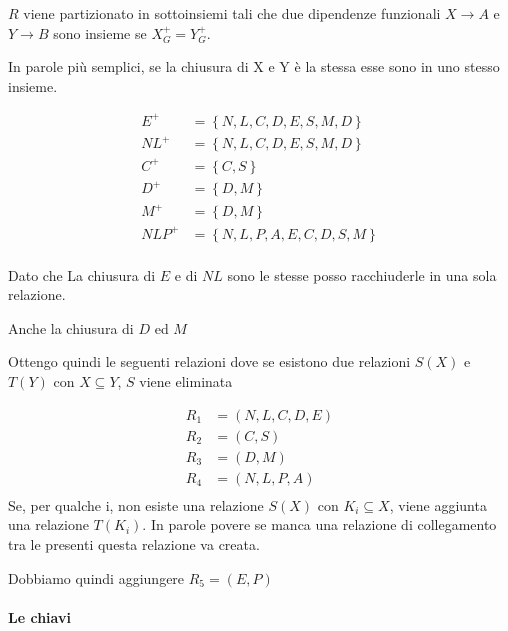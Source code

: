 \begin{exmp}
    $R$ viene partizionato in sottoinsiemi tali che due dipendenze funzionali $X \rightarrow A$ e $Y \rightarrow B$ sono insieme se $X_G^+=Y_G^+$.

    In parole più semplici, se la chiusura di X e Y è la stessa esse sono in uno stesso insieme.

    \begin{equation}
        \begin{split}
            E^+ & = \left\{ N,L,C,D,E,S,M,D \right\}  \\
            NL^+ & = \left\{ N,L,C,D,E,S,M,D \right\}  \\
            C^+ & = \left\{C, S \right\} \\
            D^+ & = \left\{D,  M\right\} \\
            M^+ & = \left\{D,M \right\}  \\
            NLP^+ & = \left\{N,L,P,A,E,C,D,S,M \right\} \\
        \end{split}
    \end{equation}

    Dato che La chiusura di $E$ e di $NL$ sono le stesse posso racchiuderle in una sola relazione.

    Anche la chiusura di $D$ ed $M$

    Ottengo quindi le seguenti relazioni dove se esistono due relazioni $S(X)$ e $T(Y)$ con $X \subseteq Y$, $S$ viene eliminata

    \begin{equation}
        \begin{split}
            R_1 & =  (N,L,C,D,E ) \\
            R_2 & = (C, S)\\
            R_3 & = (D, M) \\
            R_4 & = (N,L,P,A) \\
        \end{split}
    \end{equation}
    Se, per qualche i, non esiste una relazione $S(X)$ con $K_i \subseteq X$, viene aggiunta una relazione $T(K_i )$.
    In parole povere se manca una relazione di collegamento tra le presenti questa relazione va creata.

    Dobbiamo quindi aggiungere $R_5 = (E,P)$
    
    \paragraph{Le chiavi}


\end{exmp}
